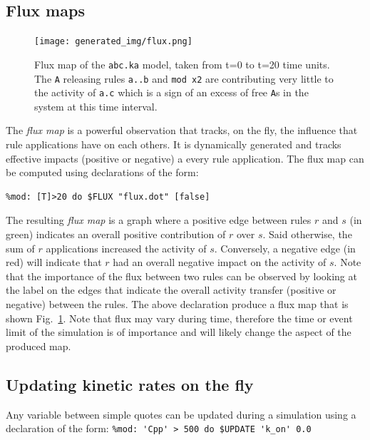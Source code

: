 \documentclass[11pt]{book}
\def\ttt#1{\texttt{#1}}
\begin{document}
\subsection{Flux maps}

\begin{figure}[p] %
   \centering
\texttt{[image: generated\_img/flux.png]}
   \caption{Flux map of the \ttt{abc.ka} model, taken from t=0 to t=20 time units. The \ttt{A} releasing rules \ttt{a..b} and \ttt{mod x2} are contributing very little to the activity of \ttt{a.c} which is a sign of an excess of free \ttt{A}s in the system at this time interval.}
   \label{fig:flux}
\end{figure}
The \emph{flux map} is a powerful observation that tracks, on the fly, the influence that rule applications have on each others. It is dynamically generated and tracks effective impacts (positive or negative) a every rule application. The flux map can be computed using declarations of the form:
\begin{lstlisting}[language=kappa]
%mod: [true] do $FLUX "flux.dot" [true]
%mod: [T]>20 do $FLUX "flux.dot" [false]
\end{lstlisting}
The resulting \emph{flux map} is a graph where a positive edge between rules $r$ and $s$ (in green) indicates an overall positive contribution of $r$ over $s$. Said otherwise, the sum of $r$ applications increased the activity of $s$. Conversely, a negative edge (in red) will indicate that $r$ had an overall negative impact on the activity of $s$. Note that the importance of the flux between two rules can be observed by looking at the label on the edges that indicate the overall activity transfer (positive or negative) between the rules. The above declaration produce a flux map that is shown Fig.~\ref{fig:flux}. Note that flux may vary during time, therefore the time or event limit of the simulation is of importance and will likely change the aspect of the produced map.


\subsection{Updating kinetic rates on the fly}

Any variable between simple quotes can be updated during a simulation using a declaration of the form:
\lstinline[language=kappa]!%mod: 'Cpp' > 500 do $UPDATE 'k_on' 0.0!
\end{document}
